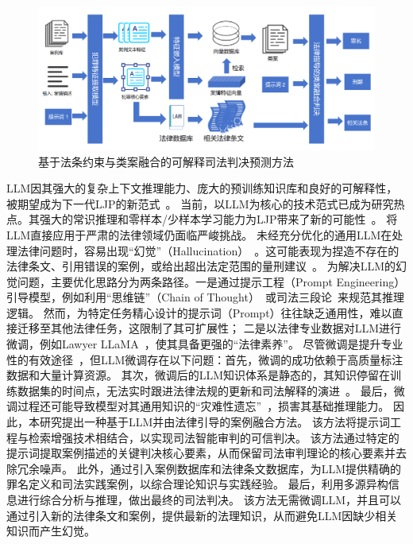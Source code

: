 \begin{figure}[htpb]
	\centering
	\includegraphics[width=1\textwidth]{fig/method.pdf}
	\caption{基于法条约束与类案融合的可解释司法判决预测方法}
	\label{fig:main}
\end{figure}

LLM因其强大的复杂上下文推理能力、庞大的预训练知识库和良好的可解释性，被期望成为下一代LJP的新范式~\cite{wu2020de-biased,yang2023baichuan,yao2020refining}。
当前，以LLM为核心的技术范式已成为研究热点。其强大的常识推理和零样本/少样本学习能力为LJP带来了新的可能性~\cite{brown2020language,huang2022towards,shu2024large,wen2024review}。
将LLM直接应用于严肃的法律领域仍面临严峻挑战。
未经充分优化的通用LLM在处理法律问题时，容易出现“幻觉”（Hallucination）~\cite{cui2023survey,radford2025improving,raffel2020exploring}。这可能表现为捏造不存在的法律条文、引用错误的案例，或给出超出法定范围的量刑建议~\cite{lewis2020retrieval}。
为解决LLM的幻觉问题，主要优化思路分为两条路径。一是通过提示工程（Prompt Engineering）引导模型，例如利用“思维链”（Chain of Thought）~\cite{kojima2022large,izacard2021leveraging,rajani2019explain,talmor2019leap,wang2023self,wei2022chain}或司法三段论~\cite{huang2023lawyer,trautmann2022legal,xu2023superclue,yu2022legal}来规范其推理逻辑。
然而，为特定任务精心设计的提示词（Prompt）往往缺乏通用性，难以直接迁移至其他法律任务，这限制了其可扩展性；
二是以法律专业数据对LLM进行微调，例如Lawyer LLaMA~\cite{chen2020recall,yue2021circumstances}，使其具备更强的“法律素养”。
尽管微调是提升专业性的有效途径~\cite{hu2021lora,hu2022lora,zelikman2024star}，但LLM微调存在以下问题：首先，微调的成功依赖于高质量标注数据和大量计算资源。
其次，微调后的LLM知识体系是静态的，其知识停留在训练数据集的时间点，无法实时跟进法律法规的更新和司法解释的演进~\cite{li2021prefix,zhang2024comprehensive}。
最后，微调过程还可能导致模型对其通用知识的“灾难性遗忘”~\cite{chen2020recall}，损害其基础推理能力。
因此，本研究提出一种基于LLM并由法律引导的案例融合方法。
该方法将提示词工程与检索增强技术相结合，以实现司法智能审判的可信判决。
该方法通过特定的提示词提取案例描述的关键判决核心要素，从而保留司法审判理论的核心要素并去除冗余噪声。
此外，通过引入案例数据库和法律条文数据库，为LLM提供精确的罪名定义和司法实践案例，以综合理论知识与实践经验。
最后，利用多源异构信息进行综合分析与推理，做出最终的司法判决。
该方法无需微调LLM，并且可以通过引入新的法律条文和案例，提供最新的法理知识，从而避免LLM因缺少相关知识而产生幻觉。



